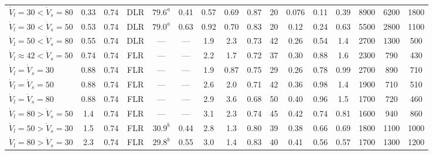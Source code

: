 \documentclass[14pt,letterpaper,fleqn]{extarticle}
\renewcommand{\textbf}[1]{#1}
\begin{document}
\begin{landscape}
\begin{table}[p]
\begin{adjustbox}{
    max totalsize={0.97\linewidth}{0.90\textheight},
    center
}
\begin{tabular}{
@{}
>{\raggedright\arraybackslash}p{3.50cm}
ccccccccc
ccc
ccc
@{}
}
\midrule
\multicolumn{16}{c}{
$\boldsymbol{w_{\mathrm{NaCl},s}=12.0\%
\approx 260~\mathrm{g_s\,L_{mix}^{-1}}}$}
\\
\midrule

$\dot{V}_{l}=30<\dot{V}_{s}=80$
& 0.33 & 0.74 & DLR & $79.6^{a}$ & 0.41 & 0.57 & 0.69 & 0.87 & 20
& 0.076 & 0.11 & 0.39 & 8900 & 6200 & 1800
\\

$\dot{V}_{l}=30<\dot{V}_{s}=50$
& 0.53 & 0.74 & DLR & $79.0^{a}$ & 0.63 & 0.92 & 0.70 & 0.83 & 20
& 0.12 & 0.24 & 0.63 & 5500 & 2800 & 1100
\\

$\dot{V}_{l}=50<\dot{V}_{s}=80$
& 0.55 & 0.74 & DLR & --- & --- & 1.9 & 2.3 & 0.73 & 42
& 0.26 & 0.54 & 1.4 & 2700 & 1300 & 500
\\

\textbf{$\dot{V}_{l}\approx42<\dot{V}_{s}=50$}
& \textbf{0.74} & \textbf{0.74} & \textbf{FLR}
& \textbf{---} & \textbf{---} & \textbf{2.2} & \textbf{1.7}
& \textbf{0.72} & \textbf{37}
& \textbf{0.30} & \textbf{0.88} & \textbf{1.6}
& \textbf{2300} & \textbf{790} & \textbf{430}
\\

$\dot{V}_{l}=\dot{V}_{s}=30$
& 0.88 & 0.74 & FLR & --- & --- & 1.9 & 0.87 & 0.75 & 29
& 0.26 & 0.78 & 0.99 & 2700 & 890 & 710
\\

$\dot{V}_{l}=\dot{V}_{s}=50$
& 0.88 & 0.74 & FLR & --- & --- & 2.6 & 2.0 & 0.71 & 42
& 0.36 & 0.98 & 1.4 & 1900 & 710 & 510
\\

\textbf{$\dot{V}_{l}=\dot{V}_{s}=80$}
& \textbf{0.88} & \textbf{0.74} & \textbf{FLR}
& \textbf{---} & \textbf{---} & \textbf{2.9} & \textbf{3.6}
& \textbf{0.68} & \textbf{50}
& \textbf{0.40} & \textbf{0.96} & \textbf{1.5}
& \textbf{1700} & \textbf{720} & \textbf{460}
\\

$\dot{V}_{l}=80>\dot{V}_{s}=50$
& 1.4 & 0.74 & FLR & --- & --- & 3.1 & 2.3 & 0.74 & 45
& 0.42 & 0.74 & 0.81 & 1600 & 940 & 860
\\

$\dot{V}_{l}=50>\dot{V}_{s}=30$
& 1.5 & 0.74 & FLR & $30.9^{b}$ & 0.44 & 2.8 & 1.3 & 0.80 & 39
& 0.38 & 0.66 & 0.69 & 1800 & 1100 & 1000
\\

$\dot{V}_{l}=80>\dot{V}_{s}=30$
& 2.3 & 0.74 & FLR & $29.8^{b}$ & 0.55 & 3.0 & 1.4 & 0.83 & 40
& 0.41 & 0.56 & 0.57 & 1700 & 1300 & 1200
\\


\end{tabular}
\end{adjustbox}
\end{table}
\end{landscape}
\end{document}

